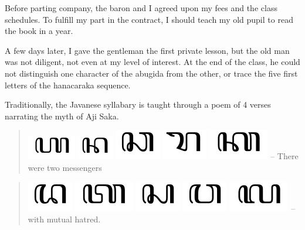 \documentclass[a4paper,12pt]{book}
\begin{document}
Before parting company, the baron and I
agreed upon my fees
and the class schedules.
To fulfill my part in the contract,
I should teach my old pupil to read
the book in a year.

A few days later, I gave the gentleman
the first private lesson, but the old man
was not diligent, not even at my level
of interest. At the
end of the class, he could not distinguish
one character of the abugida from the other,
or trace the five first letters of the
hanacaraka sequence.

Traditionally, the Javanese syllabary
is taught through a poem of 4 verses
narrating the myth of Aji Saka.
\begin{quote}
	\includegraphics[scale=0.3]{figs/ha.png}
	\includegraphics[scale=0.3]{figs/na.png}
	\includegraphics[scale=0.3]{figs/ca.png}
	\includegraphics[scale=0.3]{figs/ra.png}
	\includegraphics[scale=0.3]{figs/ka.png} --
	There were two messengers
\end{quote}
\begin{quote}
	\includegraphics[scale=0.3]{figs/da.png}
	\includegraphics[scale=0.3]{figs/ta.png}
	\includegraphics[scale=0.3]{figs/sa.png}
	\includegraphics[scale=0.3]{figs/wa.png}
	\includegraphics[scale=0.3]{figs/la.png} --
	with mutual hatred.
\end{quote}
\end{document}
